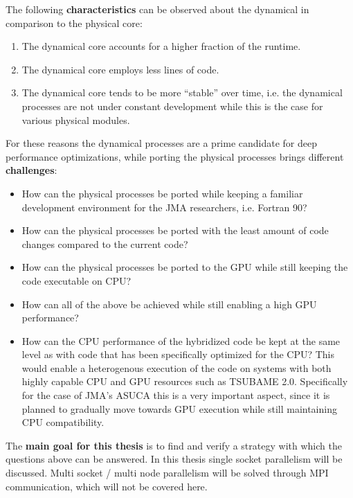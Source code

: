  The following \textbf{characteristics} can be observed about the dynamical in comparison to the physical core: 
\begin{enumerate}
 \item The dynamical core accounts for a higher fraction of the runtime.
 \item The dynamical core employs less lines of code.
 \item The dynamical core tends to be more ``stable'' over time, i.e. the dynamical processes are not under constant development while this is the case for various physical modules. 
\end{enumerate}

For these reasons the dynamical processes are a prime candidate for deep performance optimizations, while porting the physical processes brings different \textbf{challenges}: 

\begin{itemize}
 \item How can the physical processes be ported while keeping a familiar development environment for the JMA researchers, i.e. Fortran 90? 
 \item How can the physical processes be ported with the least amount of code changes compared to the current code? 
 \item How can the physical processes be ported to the GPU while still keeping the code executable on CPU?
 \item How can all of the above be achieved while still enabling a high GPU performance?
 \item How can the CPU performance of the hybridized code be kept at the same level as with code that has been specifically optimized for the CPU? This would enable a heterogenous execution of the code on systems with both highly capable CPU and GPU resources such as TSUBAME 2.0. Specifically for the case of JMA's ASUCA this is a very important aspect, since it is planned to gradually move towards GPU execution while still maintaining CPU compatibility.  
\end{itemize}

The \textbf{main goal for this thesis} is to find and verify a strategy with which the questions above can be answered. In this thesis single socket parallelism will be discussed. Multi socket / multi node parallelism will be solved through MPI communication, which will not be covered here.


